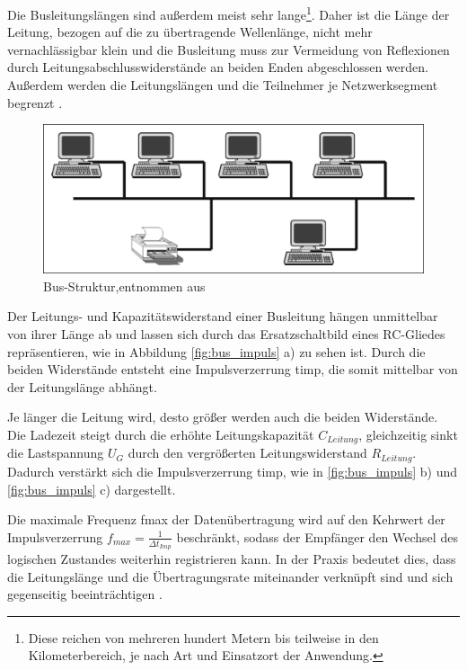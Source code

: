 Die Busleitungslängen sind außerdem meist sehr lange\footnote{Diese reichen von mehreren hundert Metern bis teilweise in den Kilometerbereich, je nach Art und Einsatzort der Anwendung.}. Daher ist die Länge der Leitung, bezogen auf die zu übertragende Wellenlänge, nicht mehr vernachlässigbar klein und die Busleitung muss zur Vermeidung von Reflexionen durch Leitungsabschlusswiderstände an beiden Enden abgeschlossen werden. Außerdem werden die Leitungslängen und die Teilnehmer je Netzwerksegment begrenzt \cite[S.~3f.]{schn06}.

\begin{figure}
\centering
\includegraphics[width=\textwidth]{abbildungen/20160109_busstruktur}
\caption[Bus-Struktur]{Bus-Struktur,entnommen aus \cite[S.~3]{schn06}}
\label{fig:bus_struktur}
\end{figure}


Der Leitungs- und Kapazitätswiderstand einer Busleitung hängen unmittelbar von ihrer Länge ab und lassen sich durch das Ersatzschaltbild eines RC-Gliedes repräsentieren, wie in Abbildung \ref{fig:bus_impuls} a) zu sehen ist. Durch die beiden Widerstände entsteht eine Impulsverzerrung \gls{timp}, die somit mittelbar von der Leitungslänge abhängt.

Je länger die Leitung wird, desto größer werden auch die beiden Widerstände. Die Ladezeit steigt durch die erhöhte Leitungskapazität $C_{Leitung}$, gleichzeitig sinkt die Lastspannung $U_{G}$ durch den vergrößerten Leitungswiderstand $R_{Leitung}$. Dadurch verstärkt sich die Impulsverzerrung \gls{timp}, wie in \ref{fig:bus_impuls} b) und \ref{fig:bus_impuls} c) dargestellt.

Die maximale Frequenz \gls{fmax} der Datenübertragung wird auf den Kehrwert der Impulsverzerrung $f_{max}=\frac{1}{\Delta t_{Imp}}$ beschränkt, sodass der Empfänger den Wechsel des logischen Zustandes weiterhin registrieren kann. In der Praxis bedeutet dies, dass die Leitungslänge und die Übertragungsrate miteinander verknüpft sind und sich gegenseitig beeinträchtigen \cite[S.~4f.]{schn06}.

